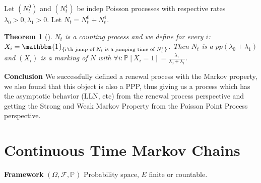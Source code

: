 \documentclass[12pt]{book}
\newtheorem{theorem}{Theorem}[section]
\theoremstyle{definition}
\theoremstyle{remark}
\begin{document}
Let $(N_t^0)$ and $(N_t^1)$ be indep Poisson processes with respective rates $\lambda_0> 0, \lambda_1> 0$. Let $N_t = N_t^0 + N_t^1$.
\begin{theorem}[]
$N_t$ is a counting process and we define for every $i $: $X_i = \mathbbm{1}_{\textrm{\{i'th jump of }N_t\textrm{ is a jumping time of }N_t^1\}}$. Then  $N_t$ is a $pp(\lambda_0 + \lambda_1)$ and  $(X_i)$ is a marking of  $N$ with $\forall i: \mathbb{P}_{} \left[ X_i=1 \right] = \frac{\lambda_1}{\lambda_0+\lambda_1}$.
\end{theorem}

\noindent \textbf{Conclusion} We successfully defined a renewal process with the Markov property, we also found that this object is also a PPP, thus giving us a process which has the asymptotic behavior (LLN, etc) from the renewal process perspective and getting the Strong and Weak Markov Property from the Poisson Point Process perspective. 

\section{Continuous Time Markov Chains}

\textbf{Framework} $(\Omega, \mathcal{F}, \mathbb{P}_{} ) $ Probability space, $E$ finite or countable. 
\end{document}
